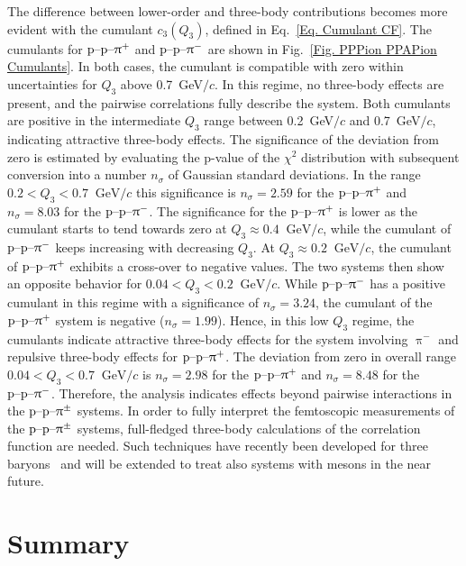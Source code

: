 \documentclass[ALICE,manyauthors]{cernphprep}
\begin{document}
The difference between lower-order and three-body contributions becomes more evident with the cumulant $c_3(Q_3)$, defined in Eq.~\eqref{Eq. Cumulant CF}. The cumulants for $\text{p--p--}\uppi^+$ and $\text{p--p--}\uppi^-$ are shown in Fig.~\ref{Fig. PPPion PPAPion Cumulants}. In both cases, the cumulant is compatible with zero within uncertainties for $Q_3$ above 0.7~GeV$/c$. In this regime, no three-body effects are present, and the pairwise correlations fully describe the system. Both cumulants are positive in the intermediate $Q_3$ range between  0.2~GeV$/c$ and  0.7~GeV$/c$, indicating attractive three-body effects. The significance of the deviation from zero is estimated by evaluating the p-value of the $\chi^2$ distribution with subsequent conversion into a number $n_\sigma$ of Gaussian standard deviations. In the range $0.2 < Q_3 < 0.7~\text{ GeV}/c $ this significance is $n_\sigma = 2.59$ for the $\text{p--p--}\uppi^+$ and $n_\sigma = 8.03$ for the $\text{p--p--}\uppi^-$. The significance for the $\text{p--p--}\uppi^+$ is lower as the cumulant starts to tend towards zero at $Q_3 \approx 0.4~\text{ GeV}/c$, while the cumulant of $\text{p--p--}\uppi^-$ keeps increasing with decreasing $Q_3$. At $Q_3 \approx 0.2~\text{ GeV}/c$, the cumulant of $\text{p--p--}\uppi^+$ exhibits a cross-over to negative values. The two systems then show an opposite behavior for $0.04 < Q_3 < 0.2~\text{ GeV}/c$. While $\text{p--p--}\uppi^-$ has a positive cumulant in this regime with a significance of $n_\sigma = 3.24$, the cumulant of the $\text{p--p--}\uppi^+$ system is negative ($n_\sigma = 1.99$). Hence, in this low $Q_3$ regime, the cumulants indicate attractive three-body effects for the system involving $\uppi^-$ and repulsive three-body effects for $\text{p--p--}\uppi^+$. The deviation from zero in overall range $0.04 < Q_3 < 0.7~\text{ GeV}/c$ is $n_\sigma = 2.98$ for the $\text{p--p--}\uppi^+$ and $n_\sigma = 8.48$ for the $\text{p--p--}\uppi^-$. Therefore, the analysis indicates effects beyond pairwise interactions in the $\text{p--p--}\uppi^\pm$ systems. In order to fully interpret the femtoscopic measurements of the $\text{p--p--}\uppi^\pm$ systems, full-fledged three-body calculations of the correlation function are needed. Such techniques have recently been developed for three baryons~\cite{KievskyThreeBody} and will be extended to treat also systems with mesons in the near future.

\section{Summary}
\label{Sec. Summary}
\end{document}
